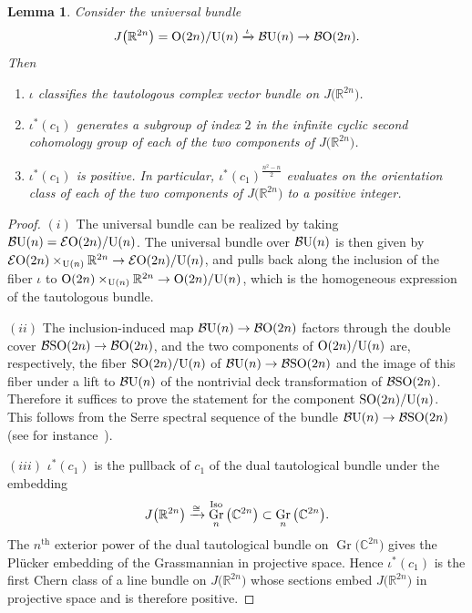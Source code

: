 \documentclass[pdftex]{sigma}%
\newcommand{\R}{\mathbb{R}}
\newcommand{\C}{\mathbb{C}}
\DeclareMathOperator{\Gr}{Gr}
\numberwithin{equation}{section}
\newtheorem{Lemma}[Theorem]{Lemma}
\begin{document}
\begin{Lemma}\label{positchern}
Consider the universal bundle
\[
J\big(\R^{2n}\big)={\rm O}(2n)/{\rm U}(n) \xrightarrow{\iota} {\mathcal B}{\rm U}(n) \to {\mathcal B}{\rm O}(2n).
\]
Then
\begin{enumerate}\itemsep=0pt
\item[$(i)$] $\iota$ classifies the tautologous complex vector bundle on $J\big(\R^{2n}\big)$.
\item[$(ii)$] $\iota^*(c_1)$ generates a subgroup of index $2$ in the infinite cyclic second cohomology group of
each of the two components of $J\big(\R^{2n}\big)$.
\item[$(iii)$] $\iota^*(c_1)$ is positive. In particular, $\iota^*(c_1)^{\frac{n^2-n}{2}}$ evaluates on the orientation class of each of the two components of $J\big(\R^{2n}\big)$ to a positive integer.
\end{enumerate}
\end{Lemma}
\begin{proof}
$(i)$ The universal bundle can be realized by taking ${\mathcal B}{\rm U}(n)={\mathcal E}{\rm O}(2n)/{\rm U}(n)$. The universal bundle over ${\mathcal B}{\rm U}(n)$ is then given by ${\mathcal E}{\rm O}(2n)\times_{{\rm U}(n)} \R^{2n} \to {\mathcal E}{\rm O}(2n)/{\rm U}(n)$, and pulls back along the inclusion of the fiber $\iota$ to ${\rm O}(2n) \times_{{\rm U}(n)} \R^{2n} \to {\rm O}(2n)/{\rm U}(n)$, which is the homogeneous expression of the tautologous bundle.

$(ii)$ The inclusion-induced map ${\mathcal B}{\rm U}(n) \to {\mathcal B}{\rm O}(2n)$ factors through the
double cover ${\mathcal B}{\rm SO}(2n) \allowbreak \to {\mathcal B}{\rm O}(2n)$, and the two components of ${\rm O}(2n)/{\rm U}(n)$ are,
respectively, the fiber ${\rm SO}(2n)/{\rm U}(n)$ of ${\mathcal B}{\rm U}(n) \to {\mathcal B}{\rm SO}(2n)$ and the image
of this fiber under a lift to ${\mathcal B}{\rm U}(n)$ of the nontrivial deck transformation of
${\mathcal B}{\rm SO}(2n)$. Therefore it suffices to prove the statement for the component
${\rm SO}(2n)/{\rm U}(n)$. This follows from the Serre spectral sequence of the bundle
${\mathcal B}{\rm U}(n) \to {\mathcal B}{\rm SO}(2n)$ (see for instance~\cite[Theorem~III.6.11]{MiTo}).

$(iii)$ $\iota^*(c_1)$ is the pullback of $c_1$ of the dual tautological bundle under the embedding
\[J\big(\R^{2n}\big) \xrightarrow{\cong} \Gr_n^{\rm Iso}\big(\C^{2n}\big) \subset \Gr_n\big(\C^{2n}\big).\]
The $n^{\mathrm{th}}$ exterior power of the dual tautological bundle on $\Gr\big(\C^{2n}\big)$ gives the
Pl\"ucker embedding of the Grassmannian in projective space. Hence $\iota^*(c_1)$ is the first
Chern class of a line bundle on $J\big(\R^{2n}\big)$ whose sections embed $J\big(\R^{2n}\big)$ in projective space and is therefore positive.\qedhere
\end{proof}
\end{document}
